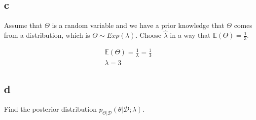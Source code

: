 \documentclass[12pt]{article}
\begin{document}
\subsection{c}
Assume that $\Theta $ is a random variable and we have a prior knowledge that $\Theta$ comes from a distribution, which is $\Theta \sim Exp(\lambda)$. Choose $\hat{\lambda}$ in a way that $\mathbb{E}(\Theta) = \frac{1}{3}$.
\begin{qsolve}
    \begin{gather*}
        \mathbb{E}(\Theta) = \frac{1}{\lambda} = \frac{1}{3}\\
        \lambda = 3
    \end{gather*}
\end{qsolve}

\subsection{d}
Find the posterior distribution $p_{\Theta | \mathcal{D}}(\theta | \mathcal{D} ; \lambda) $.
\end{document}
